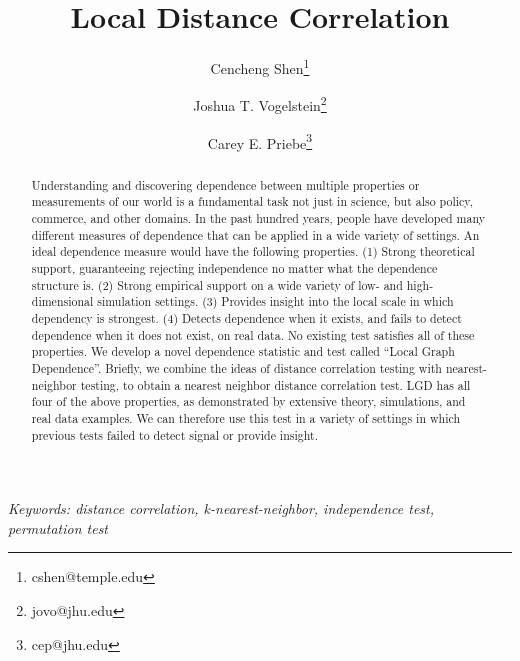 \documentclass[12pt]{article}
\begin{document}
\def\spacingset#1{\renewcommand{\baselinestretch}%
{#1}\small\normalsize} \spacingset{1}

\title{\bf Local Distance Correlation}
\author[1]{Cencheng Shen\thanks{cshen@temple.edu}}
\author[2]{Joshua T. Vogelstein\thanks{jovo@jhu.edu}}
\author[3]{Carey E. Priebe\thanks{cep@jhu.edu}}
\maketitle


\bigskip
\begin{abstract}
Understanding and discovering dependence between multiple properties or measurements of our world is a fundamental task not just in science, but also policy, commerce, and other domains. In the past hundred years, people have developed many different measures of dependence that can be applied in a wide variety of settings.  An ideal dependence measure would have the following properties. (1) Strong theoretical support, guaranteeing rejecting independence no matter what the dependence structure is. (2) Strong empirical support on a wide variety of low- and high-dimensional simulation settings. (3) Provides insight into the local scale in which dependency is strongest. (4) Detects dependence when it exists, and fails to detect dependence when it does not exist, on real data. No existing test satisfies all of these properties. We develop a novel dependence statistic and test called ``Local Graph Dependence''.  Briefly, we combine the ideas of distance correlation testing with nearest-neighbor testing, to obtain a nearest neighbor distance correlation test.  LGD has all four of the above properties, as demonstrated by extensive theory, simulations, and real data examples. We can therefore use this test in a variety of settings in which previous tests failed to detect signal or provide insight.
\end{abstract}

\noindent%
{\it Keywords: distance correlation, k-nearest-neighbor, independence test, permutation test}  
\vfill

\tableofcontents


\newpage
\spacingset{1.45} %
\end{document}
